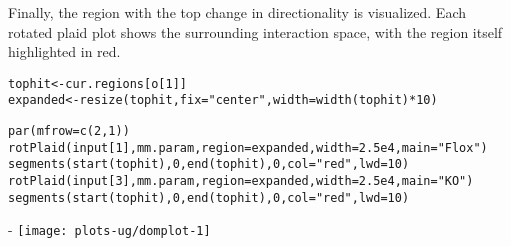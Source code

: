 \documentclass{report}\usepackage[]{graphicx}\usepackage[usenames,dvipsnames]{color}
\makeatletter
\def\maxwidth{ %
  \ifdim\Gin@nat@width>\linewidth
    \linewidth
  \else
    \Gin@nat@width
  \fi
}
\newcommand{\hlnum}[1]{\textcolor[rgb]{0.816,0.125,0.439}{#1}}%
\newcommand{\hlstr}[1]{\textcolor[rgb]{0.251,0.627,0.251}{#1}}%
\newcommand{\hlopt}[1]{\textcolor[rgb]{0,0,0}{#1}}%
\newcommand{\hlstd}[1]{\textcolor[rgb]{0.251,0.251,0.251}{#1}}%
\newcommand{\hlkwb}[1]{\textcolor[rgb]{0,0,0}{#1}}%
\newcommand{\hlkwc}[1]{\textcolor[rgb]{0.251,0.251,0.251}{#1}}%
\newcommand{\hlkwd}[1]{\textcolor[rgb]{0.878,0.439,0.125}{#1}}%
\newenvironment{knitrout}{}{} %
\makeatother
\begin{document}
\begin{knitrout}
\color{fgcolor}
\end{knitrout}

Finally, the region with the top change in directionality is visualized.
Each rotated plaid plot shows the surrounding interaction space, with the region itself highlighted in red.

\begin{knitrout}
\color{fgcolor}\begin{kframe}
\begin{alltt}
\hlstd{tophit} \hlkwb{<-} \hlstd{cur.regions[o[}\hlnum{1}\hlstd{]]}
\hlstd{expanded} \hlkwb{<-} \hlkwd{resize}\hlstd{(tophit,} \hlkwc{fix}\hlstd{=}\hlstr{"center"}\hlstd{,} \hlkwc{width}\hlstd{=}\hlkwd{width}\hlstd{(tophit)}\hlopt{*}\hlnum{10}\hlstd{)}

\hlkwd{par}\hlstd{(}\hlkwc{mfrow}\hlstd{=}\hlkwd{c}\hlstd{(}\hlnum{2}\hlstd{,}\hlnum{1}\hlstd{))}
\hlkwd{rotPlaid}\hlstd{(input[}\hlnum{1}\hlstd{], mm.param,} \hlkwc{region}\hlstd{=expanded,} \hlkwc{width}\hlstd{=}\hlnum{2.5e4}\hlstd{,} \hlkwc{main}\hlstd{=}\hlstr{"Flox"}\hlstd{)}
\hlkwd{segments}\hlstd{(}\hlkwd{start}\hlstd{(tophit),} \hlnum{0}\hlstd{,} \hlkwd{end}\hlstd{(tophit),} \hlnum{0}\hlstd{,} \hlkwc{col}\hlstd{=}\hlstr{"red"}\hlstd{,} \hlkwc{lwd}\hlstd{=}\hlnum{10}\hlstd{)}
\hlkwd{rotPlaid}\hlstd{(input[}\hlnum{3}\hlstd{], mm.param,} \hlkwc{region}\hlstd{=expanded,} \hlkwc{width}\hlstd{=}\hlnum{2.5e4}\hlstd{,} \hlkwc{main}\hlstd{=}\hlstr{"KO"}\hlstd{)}
\hlkwd{segments}\hlstd{(}\hlkwd{start}\hlstd{(tophit),} \hlnum{0}\hlstd{,} \hlkwd{end}\hlstd{(tophit),} \hlnum{0}\hlstd{,} \hlkwc{col}\hlstd{=}\hlstr{"red"}\hlstd{,} \hlkwc{lwd}\hlstd{=}\hlnum{10}\hlstd{)}
\end{alltt}
\end{kframe}\begin{adjustwidth}{0mm}{-\fltoffset}
\texttt{[image: plots-ug/domplot-1]} \end{adjustwidth}
\end{knitrout}
\end{document}

